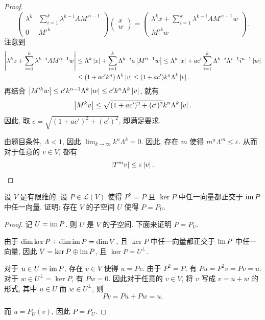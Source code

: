 \documentclass{article}
\begin{document}
\begin{proof}
\[\begin{pmatrix}
    \lambda^k & \sum_{i=1}^{k}\lambda^{k-i}A M'^{i-1}\\
    0 & M'^k
  \end{pmatrix}\begin{pmatrix}
    x\\
    w
  \end{pmatrix}
  =\begin{pmatrix}
    \lambda^k x + \sum_{i=1}^{k}\lambda^{k-i}A M'^{i-1}w\\
    M'^kw
  \end{pmatrix}. \]
  注意到
  \begin{align*}
    \left|\lambda^kx+\sum_{i=1}^{k}\lambda^{k-i}A M'^{i-1}w\right|
    &\le \Lambda^k\left|x\right| + \sum_{i=1}^{k}\Lambda^{k-i}a\left|M'^{i-1}w\right|
    \le \Lambda^k\left|x\right| + a c' \sum_{i=1}^{k}\Lambda^{k-i}\Lambda^{i-1}i^{n-1}\left|w\right|\\
    &\le \left( 1+ac'k^n \right)\Lambda^k\left|v\right|\le(1+ac')k^n\Lambda^k\left|v\right|.
  \end{align*}
  再结合 \( \left|M'^kw\right|\le c'k^{n-1}\Lambda^k\left|w\right|\le c'k^n\Lambda^k\left|v\right| \), 就有
  \[ \left|M^kv\right|\le\sqrt{(1+ac')^2+(c')^2}k^n\Lambda^k\left|v\right|. \]
  因此, 取 \( c=\sqrt{(1+ac')^2+(c')^2} \), 即满足要求.\par
  由题目条件, \( \Lambda<1 \), 因此 \( \lim_{k\to\infty}k^n\Lambda^k = 0 \).  因此, 存在 \( m \) 使得 \( m^n\Lambda^m \le \varepsilon \). 从而对于任意的 \( v\in V \), 都有
  \[ \left|T^mv\right|\le\varepsilon\left|v\right|. \]
\end{proof}



\begin{problem}[6C-9]
设 $V$ 是有限维的. 设 $P \in \mathcal{L}(V)$ 使得 $P^2 = P$ 且 $\ker P$ 中任一向量都正交于 $\operatorname{im}  P$ 中任一向量. 证明: 存在 $V$ 的子空间 $U$ 使得 $P = P_U$.
\end{problem}

\begin{proof}
  记 \( U=\operatorname{im} P \). 则 \( U \) 是 \( V \) 的子空间. 下面来证明 \( P=P_U \).\par
  由于 \( \dim\ker P+\dim\operatorname{im} P=\dim V \), 且 \( \ker P \) 中任一向量都正交于 \( \operatorname{im} P \) 中任一向量, 因此 \( V=\ker P\oplus\operatorname{im} P \), 且 \( \ker P=U^\perp \). \par
  对于 \( u\in U=\operatorname{im} P \), 存在 \( v\in V \) 使得 \( u=Pv \). 由于 \( P^2=P \), 有 \( Pu=P^2v=Pv=u \). 对于 \( w\in U^\perp=\ker P \), 有 \( Pw=0 \). 因此对于任意的 \( v\in V \), 将 \( v \) 写成 \( v=u+w \) 的形式, 其中 \( u\in U \) 而 \( w\in U^\perp \), 则
  \[ Pv=Pu+Pw=u. \]\par
  而 \( u=P_U(v) \), 因此 \( P=P_U \).
\end{proof}
\end{document}
